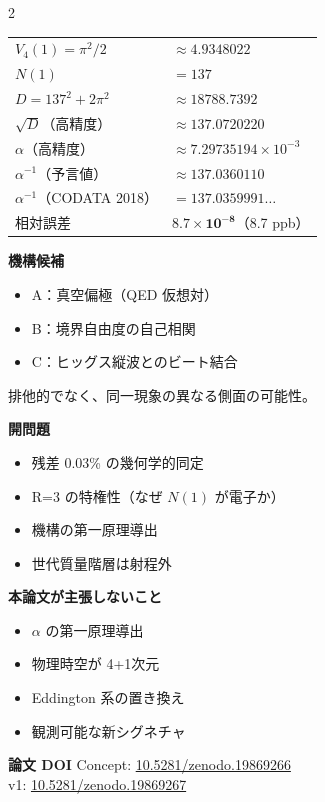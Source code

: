 \documentclass[9pt,a4paper]{ltjsarticle}
\begin{document}
\begin{multicols}{2}
\vspace{1pt}
{\footnotesize
\begin{tabular}{@{}ll@{}}
\toprule
$V_4(1) = \pi^2/2$ & $\approx 4.9348022$ \\
$N(1)$ & $= 137$ \\
$D = 137^2 + 2\pi^2$ & $\approx 18788.7392$ \\
$\sqrt{D}$（高精度） & $\approx 137.0720220$ \\
$\alpha$（高精度） & $\approx 7.29735194 \times 10^{-3}$ \\
$\alpha^{-1}$（予言値） & $\approx 137.0360110$ \\
$\alpha^{-1}$（CODATA 2018）& $= 137.0359991\ldots$ \\
相対誤差 & $\mathbf{8.7 \times 10^{-8}}$（8.7 ppb）\\
\bottomrule
\end{tabular}
}

\smallskip
\textbf{機構候補}
\begin{itemize}[topsep=1pt]
\item A：真空偏極（QED 仮想対）
\item B：境界自由度の自己相関
\item C：ヒッグス縦波とのビート結合
\end{itemize}
排他的でなく、同一現象の異なる側面の可能性。

\smallskip
\textbf{開問題}
\begin{itemize}[topsep=1pt]
\item 残差 0.03\% の幾何学的同定
\item R=3 の特権性（なぜ $N(1)$ が電子か）
\item 機構の第一原理導出
\item 世代質量階層は射程外
\end{itemize}

\smallskip
\textbf{本論文が主張しないこと}
\begin{itemize}[topsep=1pt]
\item $\alpha$ の第一原理導出
\item 物理時空が 4+1次元
\item Eddington 系の置き換え
\item 観測可能な新シグネチャ
\end{itemize}

\smallskip
\textbf{論文 DOI}\enspace
{\scriptsize Concept: \href{https://doi.org/10.5281/zenodo.19869266}{10.5281/zenodo.19869266}\\
v1: \href{https://doi.org/10.5281/zenodo.19869267}{10.5281/zenodo.19869267}}

\end{multicols}
\end{document}
